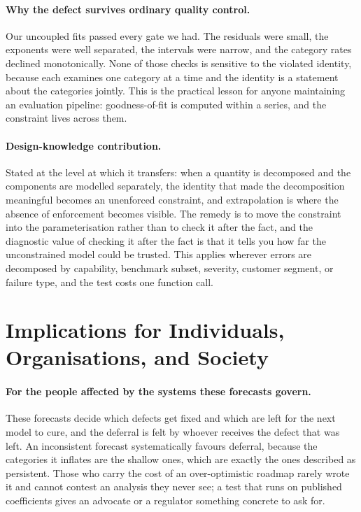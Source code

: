 \documentclass[11pt]{article}
\begin{document}
\paragraph{Why the defect survives ordinary quality control.}
Our uncoupled fits passed every gate we had. The residuals were small, the exponents
were well separated, the intervals were narrow, and the category rates declined
monotonically. None of those checks is sensitive to the violated identity, because
each examines one category at a time and the identity is a statement about the
categories jointly. This is the practical lesson for anyone maintaining an
evaluation pipeline: goodness-of-fit is computed within a series, and the constraint
lives across them.

\paragraph{Design-knowledge contribution.}
Stated at the level at which it transfers: when a quantity is decomposed and the
components are modelled separately, the identity that made the decomposition
meaningful becomes an unenforced constraint, and extrapolation is where the absence
of enforcement becomes visible. The remedy is to move the constraint into the
parameterisation rather than to check it after the fact, and the diagnostic value of
checking it after the fact is that it tells you how far the unconstrained model
could be trusted. This applies wherever errors are decomposed by capability,
benchmark subset, severity, customer segment, or failure type, and the test costs
one function call.

\section{Implications for Individuals, Organisations, and Society}
\label{sec:implications}

\paragraph{For the people affected by the systems these forecasts govern.}
These forecasts decide which defects get fixed and which are left for the next model
to cure, and the deferral is felt by whoever receives the defect that was left. An
inconsistent forecast systematically favours deferral, because the categories it
inflates are the shallow ones, which are exactly the ones described as persistent.
Those who carry the cost of an over-optimistic roadmap rarely wrote it and cannot
contest an analysis they never see; a test that runs on published coefficients gives
an advocate or a regulator something concrete to ask for.
\end{document}
